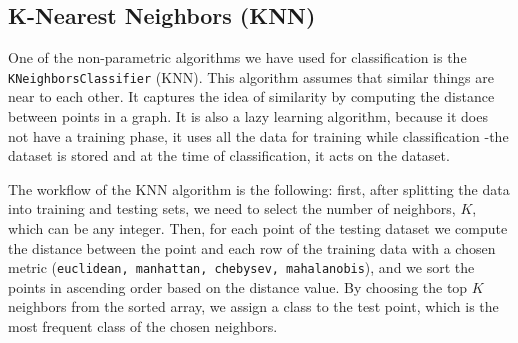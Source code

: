 \subsection{K-Nearest Neighbors (KNN)}

One of the non-parametric algorithms we have used for classification is the \texttt{KNeighborsClassifier} (KNN). This algorithm assumes that similar things are near to each other.  It captures the idea of similarity by computing the distance between points in a graph.  It is also a lazy learning algorithm, because it does not have a training phase, it uses all the data for training while classification -the dataset is stored and at the time of classification, it acts on the dataset. 

The workflow of the KNN algorithm is the following: first,  after splitting the data into training and testing sets, we need to select the number of neighbors, $K$,  which can be any integer.  Then, for each point of the testing dataset we compute the distance between the point and each row of the training data with a chosen metric (\texttt{euclidean, manhattan, chebysev, mahalanobis}), and we sort the points in ascending order based on the distance value.  By choosing the top $K$ neighbors from the sorted array, we assign a class to the test point, which is the most frequent class of the chosen neighbors.
